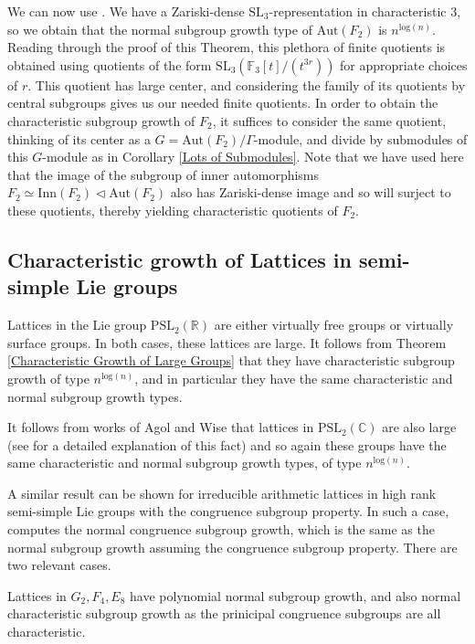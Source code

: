 \documentclass[letterpaper]{amsart}
\begin{document}
We can now use \cite[Theorem B part ii]{larsen2004g2}. We have a Zariski-dense $\mathrm{SL}_3$-representation in characteristic $3$, so we obtain that the normal subgroup growth type of $\mathrm{Aut}(F_2)$ is $n^{\mathrm{log}(n)}$. Reading through the proof of this Theorem, this plethora of finite quotients is obtained using quotients of the form $\mathrm{SL}_3(\mathbb{F}_3[t] / (t^{3r}))$ for appropriate choices of $r$. This quotient has large center, and considering the family of its quotients by central subgroups gives us our needed finite quotients. In order to obtain the characteristic subgroup growth of $F_2$, it suffices to consider the same quotient, thinking of its center as a $G = \mathrm{Aut}(F_2) / \Gamma$-module, and divide by submodules of this $G$-module as in Corollary \ref{Lots of Submodules}. Note that we have used here that the image of the subgroup of inner automorphisms $F_2 \simeq \mathrm{Inn}(F_2) \lhd \mathrm{Aut}(F_2)$ also has Zariski-dense image and so will surject to these quotients, thereby yielding characteristic quotients of $F_2$.

\subsection{Characteristic growth of Lattices in semi-simple Lie groups}
Lattices in the Lie group $\mathrm{PSL}_2(\mathbb{R})$ are either virtually free groups or virtually surface groups. In both cases, these lattices are large. It follows from Theorem \ref{Characteristic Growth of Large Groups} that they have characteristic subgroup growth of type $n^{\mathrm{log}(n)}$, and in particular they have the same characteristic and normal subgroup growth types.

It follows from works of Agol \cite{agol2013virtual} and Wise \cite{wise2021structure} that lattices in $\mathrm{PSL}_2(\mathbb{C})$ are also large (see \cite[pp. 39]{aschenbrenner20123} for a detailed explanation of this fact) and so again these groups have the same characteristic and normal subgroup growth types, of type $n^{\mathrm{log}(n)}$.

A similar result can be shown for irreducible arithmetic lattices in high rank semi-simple Lie groups with the congruence subgroup property. In such a case, \cite[Theorem C]{larsen2004g2} computes the normal congruence subgroup growth, which is the same as the normal subgroup growth assuming the congruence subgroup property. There are two relevant cases.

Lattices in $G_2, F_4, E_8$ have polynomial normal subgroup growth, and also normal characteristic subgroup growth as the prinicipal congruence subgroups are all characteristic.
\end{document}
